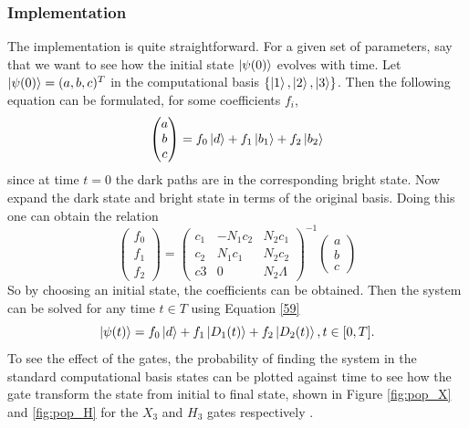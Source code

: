\subsubsection{Implementation}
The implementation is quite straightforward. For a given set of parameters, say that we want to see how the initial state $\ket{\psi(0)}$ evolves with time.
Let $\ket{\psi(0)} = (a,b,c)^T$ in the computational basis $\{\ket{1},\ket{2},\ket{3}\}$. Then the following equation can be formulated, for some coefficients $f_i$,
\begin{equation}
\begin{pmatrix}
a\\
b\\
c
\end{pmatrix}
= f_0 \ket{d} + f_1\ket{b_1} + f_2\ket{b_2}
\end{equation}
since at time $t = 0$ the dark paths are in the corresponding bright state.
Now expand the dark state and bright state in terms of the original basis. Doing this one can obtain the relation
\begin{equation}
\begin{pmatrix}
f_0\\
f_1\\
f_2
\end{pmatrix} = \begin{pmatrix}
c_1 & -N_1 c_2 & N_2 c_1
\\
c_2 & N_1 c_1 & N_2 c_2
\\
c3 & 0 & N_2 \Lambda
\end{pmatrix}^{-1}\begin{pmatrix}
a\\
b\\
c
\end{pmatrix}
\end{equation}
So by choosing an initial state, the coefficients can be obtained.
Then the system can be solved for any time $t \in T$ using Equation \ref{59}
\begin{equation}
\label{eq:expl-time}
\ket{\psi(t)} = f_0\ket{d} + f_1\ket{D_1(t)} + f_2\ket{D_2(t)}, t \in [0,T].
\end{equation}
To see the effect of the gates, the probability of finding the system in the standard computational basis states can be plotted against time to see how the gate transform the state from initial to final state, shown in Figure \ref{fig:pop_X} and \ref{fig:pop_H} for the $X_3$ and $H_3$ gates respectively . 
